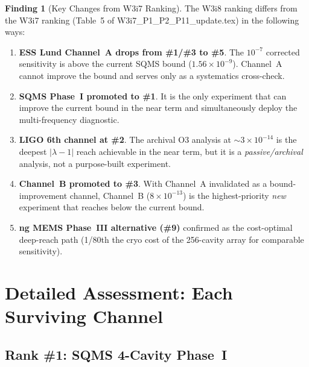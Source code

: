 \documentclass[11pt]{article}
\newcommand{\lam}{\lambda}
\newcommand{\ee}[1]{\times 10^{#1}}
\newcommand{\lbone}{|\lam - 1|}
\theoremstyle{definition}
\newtheorem{finding}[theorem]{Finding}
\theoremstyle{remark}
\begin{document}
\begin{finding}[Key Changes from W3i7 Ranking]
\label{find:ranking_changes}
The W3i8 ranking differs from the W3i7 ranking
(Table~5 of W3i7\_P1\_P2\_P11\_update.tex) in the following ways:
\begin{enumerate}[nosep]
\item \textbf{ESS Lund Channel~A drops from \#1/\#3 to \#5}. The
  $10^{-7}$ corrected sensitivity is above the current SQMS bound
  ($1.56\ee{-9}$). Channel~A cannot improve the bound and serves only
  as a systematics cross-check.
\item \textbf{SQMS Phase~I promoted to \#1}. It is the only experiment
  that can improve the current bound in the near term and simultaneously
  deploy the multi-frequency diagnostic.
\item \textbf{LIGO 6th channel at \#2}. The archival O3 analysis at
  $\sim 3\ee{-14}$ is the deepest $\lbone$ reach achievable in the
  near term, but it is a \emph{passive/archival} analysis, not a
  purpose-built experiment.
\item \textbf{Channel~B promoted to \#3}. With Channel~A invalidated
  as a bound-improvement channel, Channel~B ($8\ee{-13}$) is the
  highest-priority \emph{new} experiment that reaches below the current
  bound.
\item \textbf{ng MEMS Phase~III alternative (\#9)} confirmed as the
  cost-optimal deep-reach path (1/80th the cryo cost of the 256-cavity
  array for comparable sensitivity).
\end{enumerate}
\end{finding}


\section{Detailed Assessment: Each Surviving Channel}
\label{sec:detailed_channels}

\subsection{Rank \#1: SQMS 4-Cavity Phase~I}
\label{ssec:rank1}
\end{document}
